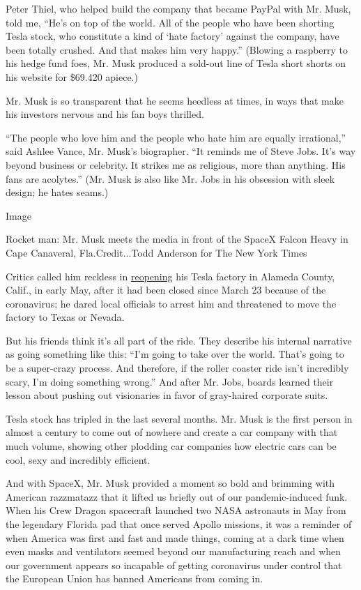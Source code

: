 Peter Thiel, who helped build the company that became PayPal with Mr.
Musk, told me, ``He's on top of the world. All of the people who have
been shorting Tesla stock, who constitute a kind of `hate factory'
against the company, have been totally crushed. And that makes him very
happy.'' (Blowing a raspberry to his hedge fund foes, Mr. Musk produced
a sold-out line of Tesla short shorts on his website for \$69.420
apiece.)

Mr. Musk is so transparent that he seems heedless at times, in ways that
make his investors nervous and his fan boys thrilled.

``The people who love him and the people who hate him are equally
irrational,'' said Ashlee Vance, Mr. Musk's biographer. ``It reminds me
of Steve Jobs. It's way beyond business or celebrity. It strikes me as
religious, more than anything. His fans are acolytes.'' (Mr. Musk is
also like Mr. Jobs in his obsession with sleek design; he hates seams.)

Image

Rocket man: Mr. Musk meets the media in front of the SpaceX Falcon Heavy
in Cape Canaveral, Fla.Credit...Todd Anderson for The New York Times

Critics called him reckless in
\href{https://www.nytimes3xbfgragh.onion/2020/05/08/business/economy/tesla-coronavirus-factory-alameda.html}{reopening}
his Tesla factory in Alameda County, Calif., in early May, after it had
been closed since March 23 because of the coronavirus; he dared local
officials to arrest him and threatened to move the factory to Texas or
Nevada.

But his friends think it's all part of the ride. They describe his
internal narrative as going something like this: ``I'm going to take
over the world. That's going to be a super-crazy process. And therefore,
if the roller coaster ride isn't incredibly scary, I'm doing something
wrong.'' And after Mr. Jobs, boards learned their lesson about pushing
out visionaries in favor of gray-haired corporate suits.

Tesla stock has tripled in the last several months. Mr. Musk is the
first person in almost a century to come out of nowhere and create a car
company with that much volume, showing other plodding car companies how
electric cars can be cool, sexy and incredibly efficient.

And with SpaceX, Mr. Musk provided a moment so bold and brimming with
American razzmatazz that it lifted us briefly out of our
pandemic-induced funk. When his Crew Dragon spacecraft launched two NASA
astronauts in May from the legendary Florida pad that once served Apollo
missions, it was a reminder of when America was first and fast and made
things, coming at a dark time when even masks and ventilators seemed
beyond our manufacturing reach and when our government appears so
incapable of getting coronavirus under control that the European Union
has banned Americans from coming in.


